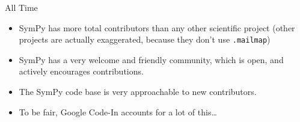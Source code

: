 \documentclass[xcolor=svgnames]{beamer}
\begin{document}
\begin{frame}
  \begin{block}{All Time}
    \begin{itemize}
    \item SymPy has more total contributors than any other scientific project
      (other projects are actually exaggerated, because they don't use
      \texttt{.mailmap})
    \item SymPy has a very welcome and friendly community, which is open, and
      actively encourages contributions.
    \item The SymPy code base is very approachable to new contributors.
    \item To be fair, Google Code-In accounts for a lot of this\ldots
    \end{itemize}
  \end{block}
\end{frame}
\end{document}
